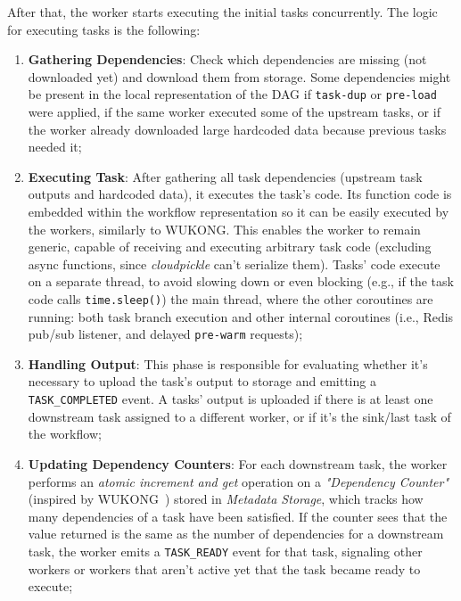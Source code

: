 \documentclass[conference]{IEEEtran}
\begin{document}
After that, the worker starts executing the initial tasks concurrently. The logic for executing tasks is the following:
\begin{enumerate}
    \item \textbf{Gathering Dependencies}: Check which dependencies are missing (not downloaded yet) and download them from storage. Some dependencies might be present in the local representation of the DAG if \texttt{task-dup} or \texttt{pre-load} were applied, if the same worker executed some of the upstream tasks, or if the worker already downloaded large hardcoded data because previous tasks needed it;
    \item \textbf{Executing Task}: After gathering all task dependencies (upstream task outputs and hardcoded data), it executes the task's code. Its function code is embedded within the workflow representation so it can be easily executed by the workers, similarly to WUKONG. This enables the worker to remain generic, capable of receiving and executing arbitrary task code (excluding async functions, since \textit{cloudpickle} can't serialize them). Tasks' code execute on a separate thread, to avoid slowing down or even blocking (e.g., if the task code calls \texttt{time.sleep()}) the main thread, where the other coroutines are running: both task branch execution and other internal coroutines (i.e., Redis pub/sub listener, and delayed \texttt{pre-warm} requests);
    \item \textbf{Handling Output}: This phase is responsible for evaluating whether it's necessary to upload the task's output to storage and emitting a \texttt{TASK\_COMPLETED} event. A tasks' output is uploaded if there is at least one downstream task assigned to a different worker, or if it's the sink/last task of the workflow;
    \item \textbf{Updating Dependency Counters}: For each downstream task, the worker performs an \textit{atomic increment and get} operation on a \textit{"Dependency Counter"} (inspired by WUKONG~\cite{wukong_2}) stored in \textit{Metadata Storage}, which tracks how many dependencies of a task have been satisfied. If the counter sees that the value returned is the same as the number of dependencies for a downstream task, the worker emits a \texttt{TASK\_READY} event for that task, signaling other workers or workers that aren't active yet that the task became ready to execute;

\end{enumerate}
\end{document}
